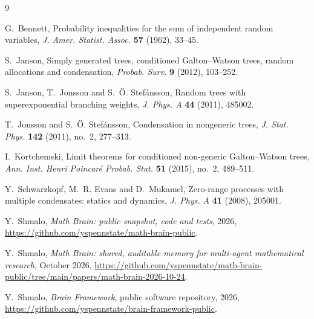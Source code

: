 \documentclass[11pt]{amsart}
\theoremstyle{remark}
\numberwithin{equation}{section}
\begin{document}
\begin{thebibliography}{9}

G.~Bennett, Probability inequalities for the sum of independent random variables, \emph{J. Amer. Statist. Assoc.} \textbf{57} (1962), 33--45.

S.~Janson, Simply generated trees, conditioned Galton--Watson trees, random allocations and condensation, \emph{Probab. Surv.} \textbf{9} (2012), 103--252.

S.~Janson, T.~Jonsson and S.~\"O. Stef\'ansson, Random trees with superexponential branching weights, \emph{J. Phys. A} \textbf{44} (2011), 485002.

T.~Jonsson and S.~\"O. Stef\'ansson, Condensation in nongeneric trees, \emph{J. Stat. Phys.} \textbf{142} (2011), no.~2, 277--313.

I.~Kortchemski, Limit theorems for conditioned non-generic Galton--Watson trees, \emph{Ann. Inst. Henri Poincar\'e Probab. Stat.} \textbf{51} (2015), no.~2, 489--511.

Y.~Schwarzkopf, M.~R. Evans and D.~Mukamel, Zero-range processes with multiple condensates: statics and dynamics, \emph{J. Phys. A} \textbf{41} (2008), 205001.

 Y.~Shmalo, \emph{Math Brain: public snapshot, code and tests}, 2026, \url{https://github.com/yspennstate/math-brain-public}.

 Y.~Shmalo, \emph{Math Brain: shared, auditable memory for multi-agent mathematical research}, October 2026, \url{https://github.com/yspennstate/math-brain-public/tree/main/papers/math-brain-2026-10-24}.

 Y.~Shmalo, \emph{Brain Framework}, public software repository, 2026, \url{https://github.com/yspennstate/brain-framework-public}.

\end{thebibliography}
\end{document}
